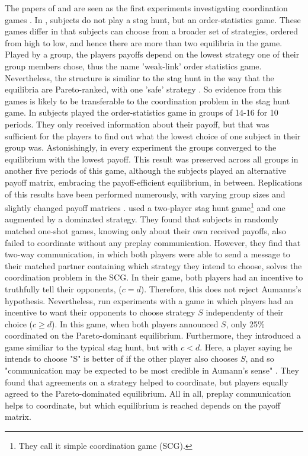 The papers of \textcite{van_huyck_tacit_1990} and 
\textcite{cooper_communication_1992} are seen as the first experiments 
investigating coordination games \parencite{devetag_when_2007}.
In \textcite{van_huyck_tacit_1990}, subjects do not play a stag
hunt, but an order-statistics game. These games differ in that subjects can
choose from a broader set of strategies, ordered from high to low, and 
hence there are more than two equilibria in the game. 
Played by a group, the players payoffs depend on the lowest strategy one of 
their group members chose, thus the name 'weak-link' order statistics game. 
Nevertheless, the structure is similiar to the stag hunt in the way 
that the equilibria are Pareto-ranked, with one 
'safe' strategy \parencite{devetag_when_2007}.
So evidence from this games is likely to be transferable to the 
coordination problem in the stag hunt game. 
In \textcite{van_huyck_tacit_1990} subjects played the order-statistics 
game in 
groups of 14-16 for 10 periods. They only received information about their 
payoff, but that was sufficient for the players to find out what the 
lowest choice of one subject in 
their group was. Astonishingly, in every experiment the groups converged
to the equilibrium with the lowest payoff. 
This result was preserved across all groups in another 
five periods of this game, although the subjects played an alternative payoff
matrix, embracing the payoff-efficient equilibrium, in between. 
Replications of this results have been performed numerously, with 
varying group sizes and slightly changed payoff matrices 
\parencite[6]{devetag_when_2007}. 
\textcite{cooper_communication_1992} used a
two-player stag hunt game\footnote{They call 
it simple coordination game (SCG).}  
and one augmented by a dominated strategy. They found that 
subjects in randomly matched one-shot games, knowing only about their own
received payoffs, also failed to coordinate without any preplay communication. 
However, they find that two-way communication, in which both players were
able to send a message to their matched partner containing which strategy
they intend to choose, solves the coordination problem in the SCG. 
In their game, both players had an incentive to truthfully tell their
opponents, ($c=d$). Therefore, this does not reject Aumanns's hypothesis.
Nevertheless, \textcite{clark_when_2001} run experiments with a game in which
players had an incentive to want their opponents to choose strategy $S$ 
independenty of their choice ($c \geq d$).
In this game, when both players announced $S$, only 25\% coordinated on
the Pareto-dominant equilibrium. Furthermore, they introduced a game
similiar to the typical stag hunt, but with $c<d$. Here, a player saying he 
intends to choose "S" is better of if the other player also chooses $S$, and
so "communication may be expected to be most credible in Aumann's sense" 
\parencite[508]{clark_when_2001}. They found that agreements on a strategy
helped to coordinate, but players equally agreed to the Pareto-dominated
equilibrium. 
All in all, preplay communication helps to coordinate, but which
equilibrium is reached depends on the payoff matrix.

